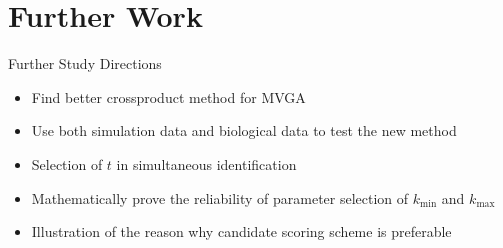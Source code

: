 \documentclass[xcolor=dvipsnames]{beamer}
\begin{document}
\section{Further Work}
\begin{frame}{Further Study Directions}
\begin{itemize}
\item Find better crossproduct method for MVGA\\
\item Use both simulation data and biological data to test the new method\\
\item Selection of $t$ in simultaneous identification\\
\item Mathematically prove the reliability of parameter selection of $k_{\min}$ and $k_{\max}$\\
\item Illustration of the reason why candidate scoring scheme is preferable\\
\end{itemize}
\end{frame}
\end{document}
